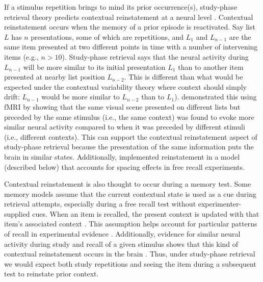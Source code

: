 
If a stimulus repetition brings to mind its prior occurrence(s), study-phase retrieval theory predicts contextual reinstatement at a neural level \cite{HowaKaha2002}.  Contextual reinstatement occurs when the memory of a prior episode is reactivated.  Say list $L$ has $n$ presentations, some of which are repetitions, and $L_{1}$ and $L_{n-1}$ are the same item presented at two different points in time with a number of intervening items (e.g., $n>10$).  Study-phase retrieval says that the neural activity during $L_{n-1}$ will be more similar to its initial presentation $L_{1}$ than to another item presented at nearby list position $L_{n-2}$.  This is different than what would be expected under the contextual variability theory where context should simply drift: $L_{n-1}$ would be more similar to $L_{n-2}$ than to $L_{1}$).   demonstrated this using fMRI by showing that the same visual scene presented on different lists but preceded by the same stimulus (i.e., the same context) was found to evoke more similar neural activity compared to when it was preceded by different stimuli (i.e., different contexts).  This can support the contextual reinstatement aspect of study-phase retrieval because the presentation of the same information puts the brain in similar states.  Additionally,  implemented reinstatement in a model (described below) that accounts for spacing effects in free recall experiments.


Contextual reinstatement is also thought to occur during a memory test.  Some memory models assume that the current contextual state is used as a cue during retrieval attempts, especially during a free recall test without experimenter-supplied cues.  When an item is recalled, the present context is updated with that item's associated context \cite{HowaKaha2002,SedeEtal2008}.  This assumption helps account for particular patterns of recall in experimental evidence \cite{Kaha1996,LohnKaha2014b}.
Additionally, evidence for similar neural activity during study and recall of a given stimulus shows that this kind of contextual reinstatement occurs in the brain \cite{MannEtal2011,PolyKaha2008,XueEtal2010}.
Thus, under study-phase retrieval we would expect both study repetitions and seeing the item during a subsequent test to reinstate prior context.

